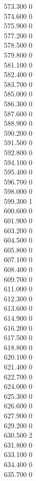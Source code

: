 { 573.300	0 \\
 574.600	0 \\
 575.900	0 \\
 577.200	0 \\
 578.500	0 \\
 579.800	0 \\
 581.100	0 \\
 582.400	0 \\
 583.700	0 \\
 585.000	0 \\
 586.300	0 \\
 587.600	0 \\
 588.900	0 \\
 590.200	0 \\
 591.500	0 \\
 592.800	0 \\
 594.100	0 \\
 595.400	0 \\
 596.700	0 \\
 598.000	0 \\
 599.300	1 \\
 600.600	0 \\
 601.900	0 \\
 603.200	0 \\
 604.500	0 \\
 605.800	0 \\
 607.100	0 \\
 608.400	0 \\
 609.700	0 \\
 611.000	0 \\
 612.300	0 \\
 613.600	0 \\
 614.900	0 \\
 616.200	0 \\
 617.500	0 \\
 618.800	0 \\
 620.100	0 \\
 621.400	0 \\
 622.700	0 \\
 624.000	0 \\
 625.300	0 \\
 626.600	0 \\
 627.900	0 \\
 629.200	0 \\
 630.500	2 \\
 631.800	0 \\
 633.100	0 \\
 634.400	0 \\
 635.700	0 \\
}
